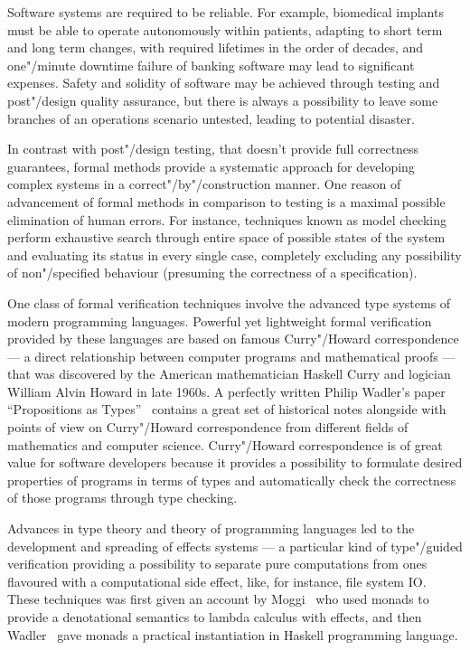 \Intro

Software systems are required to be reliable. For example, biomedical implants must be able to operate autonomously within patients, adapting to short term and long term changes, with required lifetimes in the order of decades, and one"/minute downtime failure of banking software may lead to significant expenses. Safety and solidity of software may be achieved through testing and post"/design quality assurance, but there is always a possibility to leave some branches of an operations scenario untested, leading to potential disaster.

In contrast with post"/design testing, that doesn’t provide full
correctness guarantees, formal methods provide a systematic approach for developing
complex systems in a correct"/by"/construction manner. One reason of advancement of
formal methods in comparison to testing is a maximal possible elimination of human errors.
For instance, techniques known as model checking perform exhaustive search
through entire space of possible states of the system and evaluating its status in
every single case, completely excluding any possibility of non"/specified behaviour
(presuming the correctness of a specification).

One class of formal verification techniques involve the advanced type systems of
modern programming languages. Powerful yet lightweight formal verification
provided by these languages are based on famous Curry"/Howard correspondence ---
a direct relationship between computer programs and mathematical
proofs --- that was discovered by the American mathematician Haskell Curry and logician
William Alvin Howard in late 1960s. A perfectly written Philip Wadler’s paper
``Propositions as Types''~\cite{Wadler:2015:PT:2847579.2699407}
contains a great set of historical notes alongside with points of view on
Curry"/Howard correspondence from different fields of
mathematics and computer science. Curry"/Howard correspondence is of great value
for software developers because it provides a possibility to formulate desired
properties of programs in terms of types and automatically check
the correctness of those programs through type checking.

Advances in type theory and theory of programming languages led to the development
and spreading of effects systems --- a particular kind of type"/guided verification
providing a possibility to separate pure computations from ones flavoured with
a computational side effect, like, for instance, file system IO. These techniques
was first given an account by Moggi~\cite{Moggi:1991:NCM:116981.116984} who
used monads to provide a denotational semantics to lambda calculus with effects, and then Wadler~\cite{Wadler:1992:EFP:143165.143169} gave monads a practical instantiation in Haskell programming language.

